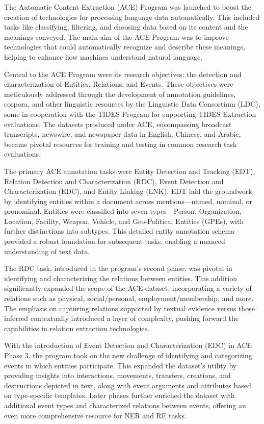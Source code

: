 The Automatic Content Extraction (ACE) Program was launched to boost the creation of technologies for processing language data automatically\cite{ACE}. This included tasks like classifying, filtering, and choosing data based on its content and the meanings conveyed. The main aim of the ACE Program was to improve technologies that could automatically recognize and describe these meanings, helping to enhance how machines understand natural language.

Central to the ACE Program were its research objectives: the detection and characterization of Entities, Relations, and Events. These objectives were meticulously addressed through the development of annotation guidelines, corpora, and other linguistic resources by the Linguistic Data Consortium (LDC), some in cooperation with the TIDES Program for supporting TIDES Extraction evaluations. The datasets produced under ACE, encompassing broadcast transcripts, newswire, and newspaper data in English, Chinese, and Arabic, became pivotal resources for training and testing in common research task evaluations.

The primary ACE annotation tasks were Entity Detection and Tracking (EDT), Relation Detection and Characterization (RDC), Event Detection and Characterization (EDC), and Entity Linking (LNK). EDT laid the groundwork by identifying entities within a document across mentions—named, nominal, or pronominal. Entities were classified into seven types—Person, Organization, Location, Facility, Weapon, Vehicle, and Geo-Political Entities (GPEs), with further distinctions into subtypes. This detailed entity annotation schema provided a robust foundation for subsequent tasks, enabling a nuanced understanding of text data.

The RDC task, introduced in the program's second phase, was pivotal in identifying and characterizing the relations between entities. This addition significantly expanded the scope of the ACE dataset, incorporating a variety of relations such as physical, social/personal, employment/membership, and more. The emphasis on capturing relations supported by textual evidence versus those inferred contextually introduced a layer of complexity, pushing forward the capabilities in relation extraction technologies.

With the introduction of Event Detection and Characterization (EDC) in ACE Phase 3, the program took on the new challenge of identifying and categorizing events in which entities participate. This expanded the dataset's utility by providing insights into interactions, movements, transfers, creations, and destructions depicted in text, along with event arguments and attributes based on type-specific templates. Later phases further enriched the dataset with additional event types and characterized relations between events, offering an even more comprehensive resource for NER and RE tasks.

